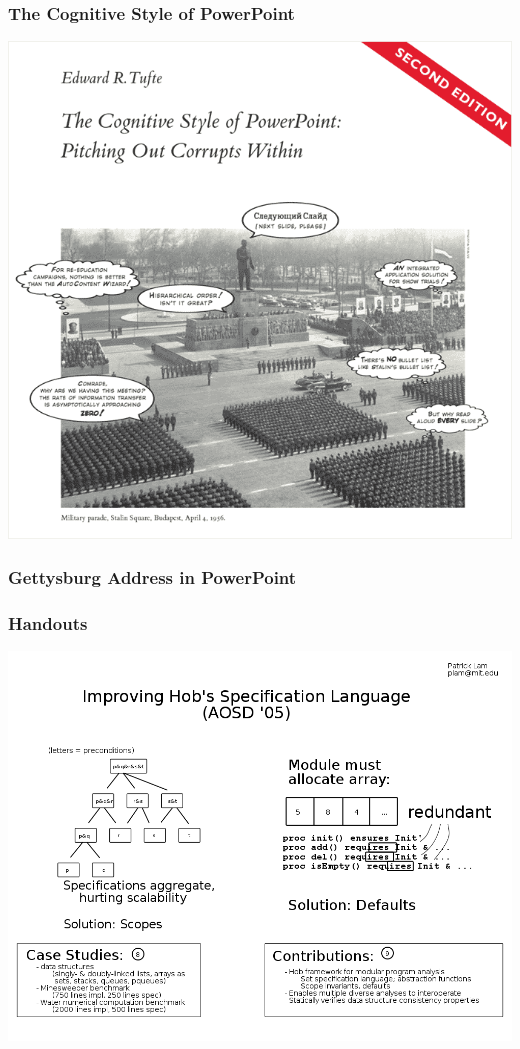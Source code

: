 \documentclass{beamer}
\begin{document}
\begin{frame}
\frametitle{The Cognitive Style of PowerPoint}

\begin{center}
\includegraphics[height=0.8\textheight]{book_pp_cover}
\end{center}

\end{frame}

\begin{frame}
\frametitle{Gettysburg Address in PowerPoint}
\end{frame}

\begin{frame}
\frametitle{Handouts}

\begin{center}
\includegraphics[height=.8\textheight]{x-handout2}
\end{center}

\end{frame}
\end{document}
